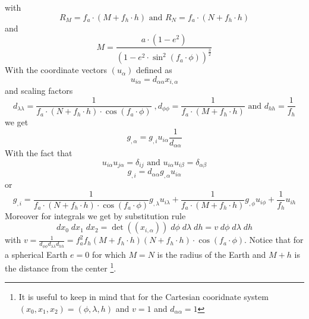 with 
\begin{equation}
R_M = f_{a}  \cdot (M + f_{h}  \cdot h) \mbox{ and }
R_N = f_{a}  \cdot  (N + f_{h}  \cdot h) 
\label{equ:geodetic:5}
\end{equation}
and 
\begin{equation}
 M = \frac{a \cdot  (1-e^2) }{(1- e^2 \cdot \sin^2(f_{a} \cdot  \phi))^{\frac{3}{2}}}
\label{equ:geodetic:5b}
\end{equation}
With the coordinate vectors $(u_{\alpha})$ defined as 
\begin{equation}
u_{i \alpha} = d_{\alpha \alpha} x_{i,\alpha}
\end{equation}
and scaling factors 
\begin{equation}
d_{\lambda \lambda} =  \frac{1}{f_{a} \cdot (N + f_{h} \cdot h) \cdot \cos(f_{a} \cdot  \phi)}  \; , 
d_{\phi \phi} = \frac{1}{f_{a} \cdot (M + f_{h} \cdot h)} \mbox{ and }
d_{h h} = \frac{1}{f_{h}}
\end{equation}
we get 
\begin{equation}
g_{,\alpha}   =    g_{,i} u_{i \alpha} \frac{1}{d_{\alpha \alpha}} 
\end{equation}
With the fact that 
\begin{equation}
 u_{i \alpha} u_{j \alpha} = \delta_{ij} \mbox{ and }  u_{i \alpha} u_{i \beta} = \delta_{\alpha \beta}
\end{equation}
\begin{equation}
g_{,i} = d_{\alpha \alpha} g_{,\alpha}  u_{i \alpha} 
\end{equation}
or 
\begin{equation}
g_{,i} = 
\frac{1}{f_{a} \cdot (N + f_{h} \cdot h) \cdot \cos(f_{a} \cdot  \phi) }  g_{,\lambda}  u_{i \lambda} +
\frac{1}{f_{a} \cdot (M + f_{h} \cdot h)}   g_{,\phi}  u_{i \phi} + 
\frac{1}{f_{h}}  u_{i h} 
\end{equation} 
Moreover for integrals we get by substitution rule 
\begin{equation}
dx_0 \; dx_1  \;  dx_2 =\det((x_{i,\alpha}))  \;  d \phi  \;   d\lambda   \;  dh = v \;  d \phi  \;   d\lambda   \;  dh
\end{equation} 
with  $v= \frac{1}{d_{\phi \phi} d_{\lambda \lambda} d_{h h}} =
f_{a}^2 f_{h} (M + f_{h} \cdot h) (N + f_{h} \cdot h) \cdot \cos(f_{a} \cdot  \phi) 
$.
Notice that for a spherical Earth $e=0$ for which $M=N$ is the radius of the Earth and $M+h$ is the distance from
the center \footnote{It is useful to keep in mind that
for the Cartesian cooridnate system $(x_0, x_1, x_2) = (\phi, \lambda, h)$ and $v=1$ and $d_{\alpha \alpha}=1$}. 

